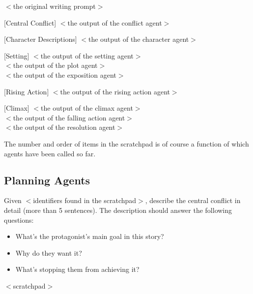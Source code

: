 \documentclass{article}
\begin{document}
\begin{tcolorbox}
$<$the original writing prompt$>$
\bigskip

[Central Conflict]
$<$the output of the conflict agent$>$
\\
\medskip 

[Character Descriptions]
$<$the output of the character agent$>$\\
\medskip

[Setting]
$<$the output of the setting agent$>$
\\
$<$the output of the plot agent$>$
\\
\medskip
[Exposition]
$<$the output of the exposition agent$>$\\
\medskip

[Rising Action]
$<$the output of the rising action agent$>$\\
\medskip

[Climax]
$<$the output of the climax agent$>$
\\
$<$the output of the falling action agent$>$
\\
\medskip
[Resolution]
$<$the output of the resolution agent$>$
\end{tcolorbox}

The number and order of items in the scratchpad is of course a function of which agents have been called so far.

\subsection{Planning Agents}
\label{appendix:planning_agents_prompts}


\begin{tcolorbox}[colback=white, colframe=my-blue, coltitle=black, parskip=5mm, title=
\textbf{\textsc{[Conflict]} Agent Prompt}, breakable, halign=flush left]
Given 
$<$identifiers found in the scratchpad$>$,
         describe the central conflict in detail (more than 5 sentences). The description should answer the following questions: 
         \begin{itemize}
        \item[{$\star$}] What's the protagonist's main goal in this story?
        \item[{$\star$}] Why do they want it? 
        \item[{$\star$}] What's stopping them from achieving it?
        \end{itemize}
$<$scratchpad$>$
        \end{tcolorbox}
        
\end{document}
